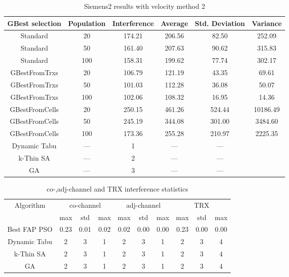 \begin{table}[H]
\centering
	\begin{tabular}{cccccc}
	\toprule
    GBest selection & Population & Interference & Average & Std. Deviation & Variance \\
    \midrule
    Standard & 20 & 174.21 & 206.56 &  82.50 & 252.09\\
    Standard & 50 & 161.40 & 207.63 &  90.62 & 315.83\\
    Standard & 100 & 158.31 & 199.62 &  77.74 & 302.17\\
    GBestFromTrxs & 20 & 106.79 & 121.19 &  43.35 &  69.61\\
    GBestFromTrxs & 50 & 101.03 & 112.28 &  36.08 &  50.07\\
    GBestFromTrxs & 100 & 102.06 & 108.32 &  16.95 &  14.36\\
    GBestFromCells & 20 & 250.15 & 461.26 & 524.44 & 10186.49\\
    GBestFromCells & 50 & 245.19 & 344.08 & 301.00 & 3484.60\\
    GBestFromCells & 100 & 173.36 & 255.28 & 210.97 & 2225.35\\
    Dynamic Tabu & --- & 1 & --- & --- \\
    k-Thin SA & --- & 2 & --- & --- \\
    GA & --- & 3 & --- & --- \\
    \bottomrule
	\end{tabular}
\caption{Siemens2 results with velocity method 2}
\label{tab:siem2m2}
\end{table}
\begin{table}[H]
\centering
	\begin{tabular}{cccccccccc}
	\toprule
    Algorithm & \multicolumn{3}{c}{co-channel} & \multicolumn{3}{c}{adj-channel} & \multicolumn{3}{c}{TRX}\\
              & max & std & max
              & max & std & max
              & max & std & max\\
    \midrule
    Best FAP PSO & 0.23 & 0.01 & 0.02 & 0.02 & 0.00 & 0.00 & 0.23 & 0.00 & 0.00 \\
    Dynamic Tabu & 2 & 3 & 1 & 2 & 3 & 1 & 2 & 3 & 4\\\hline
    k-Thin SA & 2 & 3 & 1 & 2 & 3 & 1 & 2 & 3 & 4\\\hline
    GA & 2 & 3 & 1 & 2 & 3 & 1 & 2 & 3 & 4\\\hline
    \bottomrule
	\end{tabular}
\caption{co-,adj-channel and TRX interference statistics}
\label{tab:stats-siem2m1}
\end{table}
